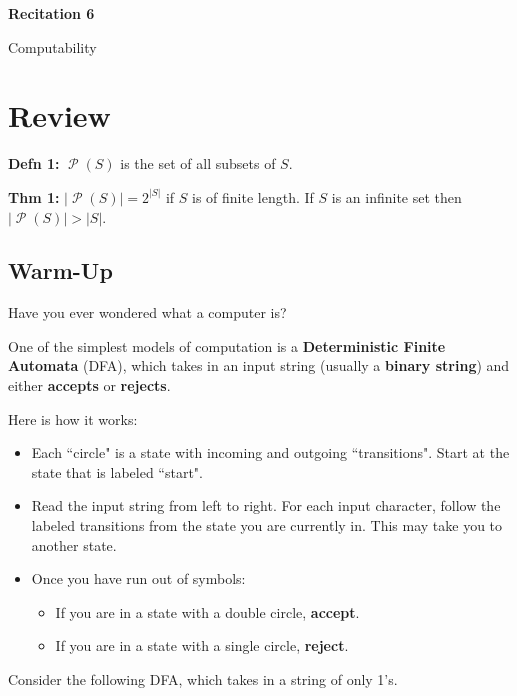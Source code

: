\documentclass[12pt,letterpaper]{article}
\newcommand\Pow{\ensuremath{\operatorname{\mathcal{P}}}}
\begin{document}
  \thispagestyle{firstpagestyle}
  \begin{center}
    {\large \textbf{Recitation 6}}
    
    {\large Computability}
  \end{center}
  
   \section*{Review}

	\textbf{Defn 1:} $\Pow{(S)}$ is the set of all subsets of $S$. 

	\textbf{Thm 1:} $|\Pow({S})| = 2^{|S|}$ if $S$ is of finite length. If $S$ is an infinite set then $|\Pow({S})| > |S|$.

	\subsection*{Warm-Up}
	
	Have you ever wondered what a computer is?

	One of the simplest models of computation is a \textbf{Deterministic Finite Automata} (DFA), which takes in an input string (usually a \textbf{binary string}) and either \textbf{accepts} or \textbf{rejects}.

	Here is how it works:
	\begin{itemize}
		\item Each ``circle" is a state with incoming and outgoing ``transitions". Start at the state that is labeled ``start".
		\item Read the input string from left to right. For each input character, follow the labeled transitions from the state you are currently in. This may take you to another state. 
		\item Once you have run out of symbols:
			\begin{itemize}
				\item If you are in a state with a double circle, \textbf{accept}. 
				\item If you are in a state with a single circle, \textbf{reject}.
			\end{itemize}
	\end{itemize}

	Consider the following DFA, which takes in a string of only 1's.

\end{document}
